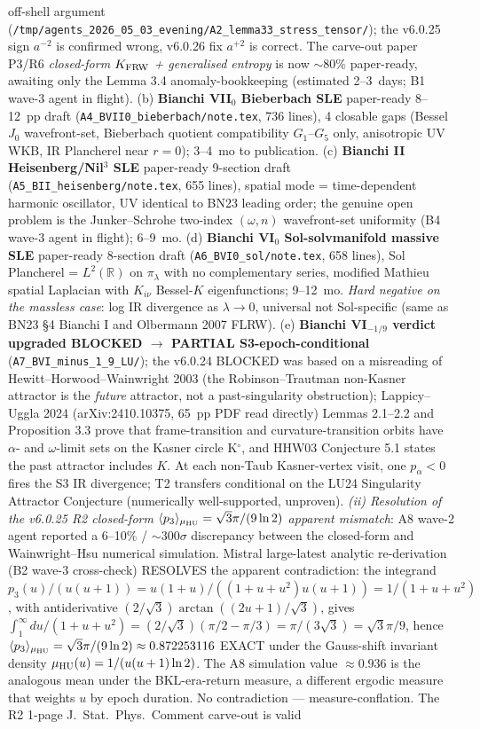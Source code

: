 \documentclass[reprint,amsmath,amssymb,aps,prd,superscriptaddress]{revtex4-2}
\providecommand{\R}{\mathbb{R}}
\providecommand{\1}{\mathbf{1}}
\begin{document}
off-shell argument (\texttt{/tmp/agents\_2026\_05\_03\_evening/A2\_lemma33\_stress\_tensor/}); the v6.0.25 sign $a^{-2}$ is confirmed wrong, v6.0.26 fix $a^{+2}$ is correct. The carve-out paper P3/R6 \emph{closed-form $K_{\rm FRW}$ + generalised entropy} is now $\sim$80\% paper-ready, awaiting only the Lemma 3.4 anomaly-bookkeeping (estimated 2--3~days; B1 wave-3 agent in flight). (b) \textbf{Bianchi VII$_0$ Bieberbach SLE} paper-ready 8--12~pp draft (\texttt{A4\_BVII0\_bieberbach/note.tex}, 736 lines), 4 closable gaps (Bessel $J_0$ wavefront-set, Bieberbach quotient compatibility $G_1$--$G_5$ only, anisotropic UV WKB, IR Plancherel near $r=0$); 3--4~mo to publication. (c) \textbf{Bianchi II Heisenberg/Nil$^3$ SLE} paper-ready 9-section draft (\texttt{A5\_BII\_heisenberg/note.tex}, 655 lines), spatial mode = time-dependent harmonic oscillator, UV identical to BN23 leading order; the genuine open problem is the Junker--Schrohe two-index $(\omega, n)$ wavefront-set uniformity (B4 wave-3 agent in flight); 6--9~mo. (d) \textbf{Bianchi VI$_0$ Sol-solvmanifold massive SLE} paper-ready 8-section draft (\texttt{A6\_BVI0\_sol/note.tex}, 658 lines), Sol Plancherel = $L^2(\R)$ on $\pi_\lambda$ with no complementary series, modified Mathieu spatial Laplacian with $K_{i\nu}$ Bessel-$K$ eigenfunctions; 9--12~mo. \emph{Hard negative on the massless case}: log IR divergence as $\lambda \to 0$, universal not Sol-specific (same as BN23 \S 4 Bianchi I and Olbermann 2007 FLRW). (e) \textbf{Bianchi VI$_{-1/9}$ verdict upgraded BLOCKED $\to$ PARTIAL S3-epoch-conditional} (\texttt{A7\_BVI\_minus\_1\_9\_LU/}); the v6.0.24 BLOCKED was based on a misreading of Hewitt--Horwood--Wainwright 2003 (the Robinson--Trautman non-Kasner attractor is the \emph{future} attractor, not a past-singularity obstruction); Lappicy--Uggla 2024 (arXiv:2410.10375, 65~pp PDF read directly) Lemmas 2.1--2.2 and Proposition 3.3 prove that frame-transition and curvature-transition orbits have $\alpha$- and $\omega$-limit sets on the Kasner circle K$^\circ$, and HHW03 Conjecture 5.1 states the past attractor includes $K$. At each non-Taub Kasner-vertex visit, one $p_\alpha < 0$ fires the S3 IR divergence; T2 transfers conditional on the LU24 Singularity Attractor Conjecture (numerically well-supported, unproven). \emph{(ii) Resolution of the v6.0.25 R2 closed-form $\langle p_3\rangle_{\mu_{\rm HU}} = \sqrt{3}\pi/(9\ln 2)$ apparent mismatch}: A8 wave-2 agent reported a 6--10\% / $\sim$300$\sigma$ discrepancy between the closed-form and Wainwright--Hsu numerical simulation. Mistral large-latest analytic re-derivation (B2 wave-3 cross-check) RESOLVES the apparent contradiction: the integrand $p_3(u)/(u(u+1)) = u(1+u)/((1+u+u^2)u(u+1)) = 1/(1+u+u^2)$, with antiderivative $(2/\sqrt{3})\arctan((2u+1)/\sqrt{3})$, gives $\int_1^\infty du/(1+u+u^2) = (2/\sqrt{3})(\pi/2 - \pi/3) = \pi/(3\sqrt{3}) = \sqrt{3}\pi/9$, hence $\langle p_3\rangle_{\mu_{\rm HU}} = \sqrt{3}\pi/(9\ln 2) \approx 0.872253116$ EXACT under the Gauss-shift invariant density $\mu_{\rm HU}(u)=1/(u(u+1)\ln 2)$. The A8 simulation value $\approx 0.936$ is the analogous mean under the BKL-era-return measure, a different ergodic measure that weights $u$ by epoch duration. No contradiction — measure-conflation. The R2 1-page J.~Stat.~Phys.\ Comment carve-out is valid 
\end{document}
